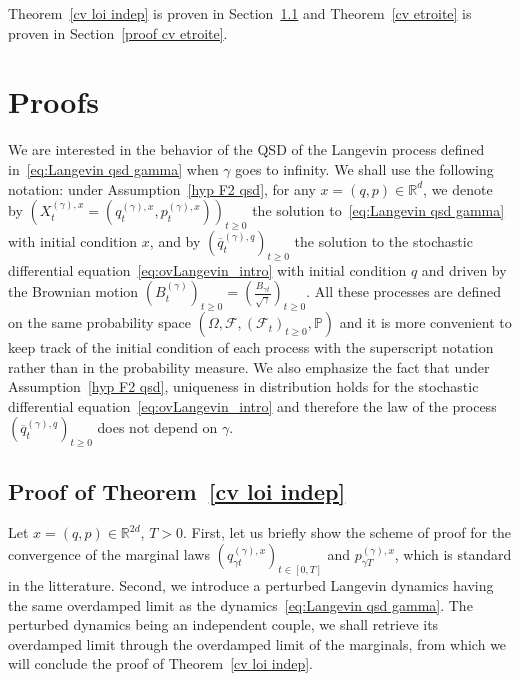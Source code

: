 \documentclass[preprint,EJP]{ejpecp}
\begin{document}
Theorem~\ref{cv loi indep} is proven in Section~\ref{proof cv loi indep} and Theorem~\ref{cv etroite} is proven in Section~\ref{proof cv etroite}. 

  
\section{Proofs}\label{tightness convergence langevin} 

We are interested  in the behavior of the QSD of the Langevin process defined in~\eqref{eq:Langevin qsd gamma} when $\gamma$ goes to infinity. 
We shall use the following notation: under Assumption~\ref{hyp F2 qsd}, for any $x=(q,p) \in \mathbb{R}^d$, we denote by $(X^{(\gamma),x}_t=(q^{(\gamma),x}_t,p^{(\gamma),x}_t))_{t \geq 0}$ the solution to~\eqref{eq:Langevin qsd gamma} with initial condition $x$, and by $(\overline{q}^{(\gamma),q}_t)_{t \geq 0}$ the solution to the stochastic differential equation~\eqref{eq:ovLangevin_intro} with initial condition $q$ and driven by the Brownian motion $(B^{(\gamma)}_t)_{t \geq 0}=(\frac{B_{\gamma t}}{\sqrt{\gamma}})_{t\geq0}$. All these processes are defined on the same probability space $(\Omega, \mathcal{F}, (\mathcal{F}_t)_{t \geq 0},\mathbb{P})$ and it is more convenient to keep track of the initial condition of each process with the superscript notation rather than in the probability measure. We also emphasize the fact that under Assumption~\ref{hyp F2 qsd}, uniqueness in distribution holds for the stochastic differential equation~\eqref{eq:ovLangevin_intro} and therefore the law of the process $(\overline{q}^{(\gamma),q}_t)_{t \geq 0}$ does not depend on $\gamma$.

\subsection{Proof of Theorem~\ref{cv loi indep}}\label{proof cv loi indep}
Let $x=(q,p)\in\mathbb{R}^{2d}$, $T>0$. First, let us briefly show the scheme of proof for the convergence of the marginal laws $(q^{(\gamma),x}_{\gamma t})_{t\in[0,T]}$ and $p^{(\gamma),x}_{\gamma T}$, which is standard in the litterature. Second, we introduce a perturbed Langevin dynamics having the same overdamped limit as the dynamics~\eqref{eq:Langevin qsd gamma}. The perturbed dynamics being an independent couple, we shall retrieve its overdamped limit through the overdamped limit of the marginals, from which we will conclude the proof of Theorem~\ref{cv loi indep}.  
\end{document}
